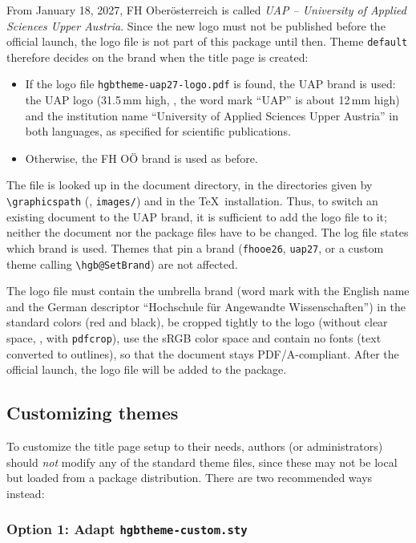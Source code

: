 \documentclass[language=english]{hgbarticle}
\begin{document}
From January 18, 2027, FH Oberösterreich is called \emph{UAP -- University of Applied Sciences
Upper Austria}. Since the new logo must not be published before the official launch, the logo file
is not part of this package until then. Theme \texttt{default} therefore decides on the brand when
the title page is created:
%
\begin{itemize}
	\item If the logo file \texttt{hgbtheme-uap27-logo.pdf} is found, the UAP brand is used:
		the UAP logo (31.5\,mm high, \ie, the word mark ``UAP'' is about 12\,mm high) and the
		institution name ``University of Applied Sciences Upper Austria'' in both languages, as
		specified for scientific publications.
	\item Otherwise, the FH OÖ brand is used as before.
\end{itemize}
%
The file is looked up in the document directory, in the directories given by
\verb!\graphicspath! (\eg, \texttt{images/}) and in the \TeX\ installation. Thus, to switch an
existing document to the UAP brand, it is sufficient to add the logo file to it; neither the document
nor the package files have to be changed. The log file states which brand is used. Themes that pin
a brand (\texttt{fhooe26}, \texttt{uap27}, or a custom theme calling \verb!\hgb@SetBrand!) are not
affected.

The logo file must contain the umbrella brand (word mark with the English name and the German
descriptor ``Hochschule für Angewandte Wissenschaften'') in the standard colors (red and black), be
cropped tightly to the logo (without clear space, \eg, with \texttt{pdfcrop}), use the sRGB color
space and contain no fonts (text converted to outlines), so that the document stays PDF/A-compliant.
After the official launch, the logo file will be added to the package.


\subsection{Customizing themes}
\label{sec:CustomizingThemes}

To customize the title page setup to their needs, authors (or administrators) should 
\emph{not} modify any of the standard theme files, since these may not be local but loaded
from a package distribution.
There are two recommended ways instead:

\subsubsection{Option 1: Adapt \texttt{hgbtheme-custom.sty}}
\end{document}
